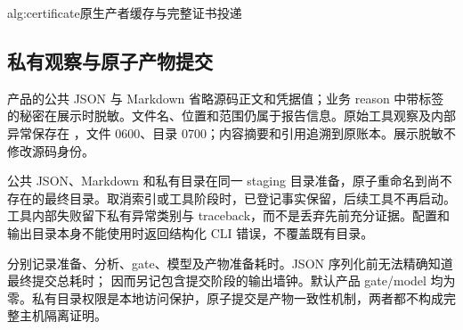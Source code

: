 \begin{pseudocode}{alg:certificate}{原生产者缓存与完整证书投递}
\end{pseudocode}

\subsection{私有观察与原子产物提交}
产品的公共 JSON 与 Markdown 省略源码正文和凭据值；业务 reason 中带标签的秘密在展示时脱敏。文件名、位置和范围仍属于报告信息。原始工具观察及内部异常保存在 ，文件 0600、目录 0700；内容摘要和引用追溯到原账本。展示脱敏不修改源码身份。

公共 JSON、Markdown 和私有目录在同一 staging 目录准备，原子重命名到尚不存在的最终目录。取消索引或工具阶段时，已登记事实保留，后续工具不再启动。工具内部失败留下私有异常类别与 traceback，而不是丢弃先前充分证据。配置和输出目录本身不能使用时返回结构化 CLI 错误，不覆盖既有目录。

 分别记录准备、分析、gate、模型及产物准备耗时。JSON 序列化前无法精确知道最终提交总耗时； 因而另记包含提交阶段的输出墙钟。默认产品 gate/model 均为零。私有目录权限是本地访问保护，原子提交是产物一致性机制，两者都不构成完整主机隔离证明。\citep{productguide,acceptance}

